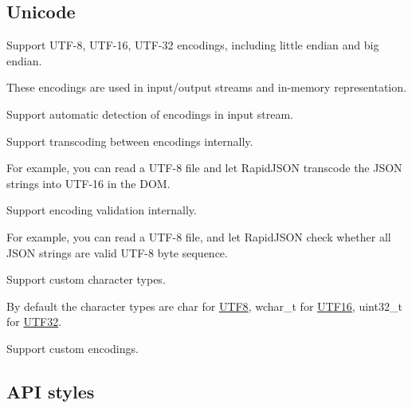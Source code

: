 \subsection*{Unicode}


\begin{DoxyItemize}
\item Support U\+T\+F-\/8, U\+T\+F-\/16, U\+T\+F-\/32 encodings, including little endian and big endian.
\begin{DoxyItemize}
\item These encodings are used in input/output streams and in-\/memory representation.
\end{DoxyItemize}
\item Support automatic detection of encodings in input stream.
\item Support transcoding between encodings internally.
\begin{DoxyItemize}
\item For example, you can read a U\+T\+F-\/8 file and let Rapid\+J\+S\+ON transcode the J\+S\+ON strings into U\+T\+F-\/16 in the D\+OM.
\end{DoxyItemize}
\item Support encoding validation internally.
\begin{DoxyItemize}
\item For example, you can read a U\+T\+F-\/8 file, and let Rapid\+J\+S\+ON check whether all J\+S\+ON strings are valid U\+T\+F-\/8 byte sequence.
\end{DoxyItemize}
\item Support custom character types.
\begin{DoxyItemize}
\item By default the character types are {\ttfamily char} for \hyperlink{struct_u_t_f8}{U\+T\+F8}, {\ttfamily wchar\+\_\+t} for \hyperlink{struct_u_t_f16}{U\+T\+F16}, {\ttfamily uint32\+\_\+t} for \hyperlink{struct_u_t_f32}{U\+T\+F32}.
\end{DoxyItemize}
\item Support custom encodings.
\end{DoxyItemize}

\subsection*{A\+PI styles}


